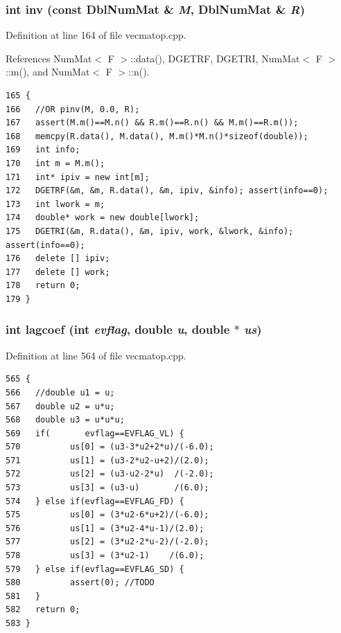 \subsubsection{\setlength{\rightskip}{0pt plus 5cm}int inv (const {\bf Dbl\-Num\-Mat} \& {\em M}, {\bf Dbl\-Num\-Mat} \& {\em R})}\label{vecmatop_8hpp_9b79730e9b5f630d287f00e551e8c344_9b79730e9b5f630d287f00e551e8c344}




Definition at line 164 of file vecmatop.cpp.

References Num\-Mat$<$ F $>$::data(), DGETRF, DGETRI, Num\-Mat$<$ F $>$::m(), and Num\-Mat$<$ F $>$::n().

\footnotesize\begin{verbatim}165 {
166   //OR pinv(M, 0.0, R);
167   assert(M.m()==M.n() && R.m()==R.n() && M.m()==R.m());
168   memcpy(R.data(), M.data(), M.m()*M.n()*sizeof(double));
169   int info;
170   int m = M.m();
171   int* ipiv = new int[m];
172   DGETRF(&m, &m, R.data(), &m, ipiv, &info); assert(info==0);
173   int lwork = m;
174   double* work = new double[lwork];
175   DGETRI(&m, R.data(), &m, ipiv, work, &lwork, &info);  assert(info==0);
176   delete [] ipiv;
177   delete [] work;
178   return 0;
179 }
\end{verbatim}\normalsize 


\subsubsection{\setlength{\rightskip}{0pt plus 5cm}int lagcoef (int {\em evflag}, double {\em u}, double $\ast$ {\em us})}\label{vecmatop_8hpp_ae45c5a2ae5bb64731d2e859f5ca0586_ae45c5a2ae5bb64731d2e859f5ca0586}




Definition at line 564 of file vecmatop.cpp.

\footnotesize\begin{verbatim}565 {
566   //double u1 = u;
567   double u2 = u*u;
568   double u3 = u*u*u;
569   if(       evflag==EVFLAG_VL) {
570          us[0] = (u3-3*u2+2*u)/(-6.0);
571          us[1] = (u3-2*u2-u+2)/(2.0);
572          us[2] = (u3-u2-2*u)  /(-2.0);
573          us[3] = (u3-u)       /(6.0);
574   } else if(evflag==EVFLAG_FD) {
575          us[0] = (3*u2-6*u+2)/(-6.0);
576          us[1] = (3*u2-4*u-1)/(2.0);
577          us[2] = (3*u2-2*u-2)/(-2.0);
578          us[3] = (3*u2-1)    /(6.0);
579   } else if(evflag==EVFLAG_SD) {
580          assert(0); //TODO
581   }
582   return 0;
583 }
\end{verbatim}\normalsize 


